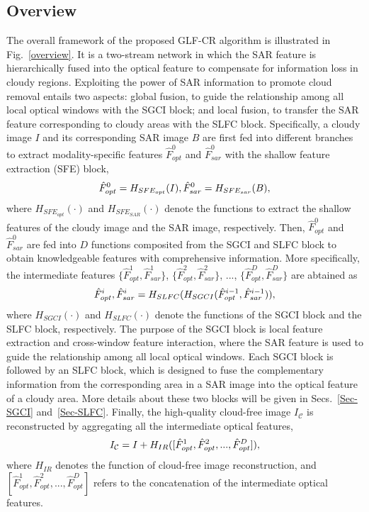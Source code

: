 \documentclass[a4paper,fleqn]{cas-dc}
\begin{document}
\subsection{Overview}
The overall framework of the proposed GLF-CR algorithm is illustrated in Fig.~\ref{overview}. It is a two-stream network in which the SAR feature is hierarchically fused into the optical feature to compensate for information loss in cloudy regions.  Exploiting the power of SAR information to promote cloud removal entails two aspects: global fusion, to guide the relationship among all local optical windows with the SGCI block; and local fusion, to transfer the SAR feature corresponding to cloudy areas with the SLFC block. Specifically, 
a cloudy image $I$ and its corresponding SAR image $B$ are first fed into different branches to extract modality-specific features $\hat{F}^0_{opt}$ and $\hat{F}^0_{sar}$ with the shallow feature extraction (SFE) block, 
\begin{equation}
	\setlength{\abovedisplayskip}{4pt}	
	\setlength{\belowdisplayskip}{4pt}
	\hat{F}^0_{opt} = H_{SFE_{opt}}(I), \hat{F}^0_{sar} = H_{SFE_{sar}}(B),
	\label{SFE}
\end{equation}
where $H_{SFE_{opt}}(\cdot)$ and $H_{SFE_{SAR}}(\cdot)$ denote the functions to extract the shallow features of the cloudy image and the SAR image, respectively.
Then, 
$\hat{F}^0_{opt}$ and $\hat{F}^0_{sar}$ are fed into $D$ functions composited from the SGCI and SLFC block to obtain knowledgeable features with comprehensive information. 
More specifically, 
the intermediate features $\{\hat{F}^1_{opt}, \hat{F}^1_{sar}\}$,  $\{\hat{F}^2_{opt}, \hat{F}^2_{sar}\}$, ..., $\{\hat{F}^D_{opt}, \hat{F}^D_{sar}\}$ are abtained as
\begin{equation}
	\setlength{\abovedisplayskip}{4pt}	
	\setlength{\belowdisplayskip}{4pt}
	\hat{F}^i_{opt}, \hat{F}^i_{sar} = H_{SLFC}(H_{SGCI}(\hat{F}^{i-1}_{opt}, \hat{F}^{i-1}_{sar})),
	\label{fusion}
\end{equation}
where $H_{SGCI}(\cdot)$ and $H_{SLFC}(\cdot)$ denote the functions of the SGCI block and the SLFC block, respectively.
The purpose of the SGCI block is local feature extraction and cross-window feature interaction, where the SAR feature is used to guide the relationship among all local optical windows. Each SGCI block is followed by an SLFC block, which is designed to fuse the complementary information from the corresponding area in a SAR image into the optical feature of a cloudy area. More details about these two blocks will be given in Secs.~\ref{Sec-SGCI} and~\ref{Sec-SLFC}.
Finally, 
the high-quality cloud-free image $I_{\mathcal{C}}$ is reconstructed by aggregating all the intermediate optical features,
\begin{equation}
	\setlength{\abovedisplayskip}{4pt}	
	\setlength{\belowdisplayskip}{4pt}
	I_{\mathcal{C}} = I + H_{IR}([\hat{F}^1_{opt}, \hat{F}^2_{opt}, ..., \hat{F}^D_{opt}]),
	\label{reconstruction}
\end{equation}
where $H_{IR}$ denotes the function of cloud-free image reconstruction, and $[\hat{F}^1_{opt}, \hat{F}^2_{opt}, ..., \hat{F}^D_{opt}]$ refers to the concatenation of the intermediate optical features. 
\end{document}
